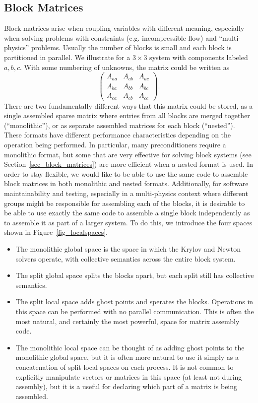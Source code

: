 \subsection{Block Matrices}
\label{sec_matnest}
Block matrices arise when coupling variables with different meaning, especially when solving problems with constraints (e.g. incompressible flow) and ``multi-physics'' problems.
Usually the number of blocks is small and each block is partitioned in parallel.
We illustrate for a $3\times 3$ system with components labeled $a,b,c$.
With some numbering of unknowns, the matrix could be written as
\[
\left( \begin{array}{ccc}
    A_{aa} & A_{ab} & A_{ac} \\
    A_{ba} & A_{bb} & A_{bc} \\
    A_{ca} & A_{cb} & A_{cc}
  \end{array} \right) .
\]
There are two fundamentally different ways that this matrix could be stored, as a single assembled sparse matrix where entries from all blocks are merged together (``monolithic''), or as separate assembled matrices for each block (``nested'').
These formats have different performance characteristics depending on the operation being performed.
In particular, many preconditioners require a monolithic format, but some that are very effective for solving block systems (see Section~\ref{sec_block_matrices}) are more efficient when a nested format is used.
In order to stay flexible, we would like to be able to use the same code to assemble block matrices in both monolithic and nested formats.
Additionally, for software maintainability and testing, especially in a multi-physics context where different groups might be responsible for assembling each of the blocks, it is desirable to be able to use exactly the same code to assemble a single block independently as to assemble it as part of a larger system.
To do this, we introduce the four spaces shown in Figure~\ref{fig_localspaces}.
\begin{itemize}
\item The monolithic global space is the space in which the Krylov and Newton solvers operate, with collective semantics across the entire block system.
\item The split global space splits the blocks apart, but each split still has collective semantics.
\item The split local space adds ghost points and sperates the blocks.
  Operations in this space can be performed with no parallel communication.
  This is often the most natural, and certainly the most powerful, space for matrix assembly code.
\item The monolithic local space can be thought of as adding ghost points to the monolithic global space, but it is often more natural to use it simply as a concatenation of split local spaces on each process.
  It is not common to explicitly manipulate vectors or matrices in this space (at least not during assembly), but it is a useful for declaring which part of a matrix is being assembled.
\end{itemize}

